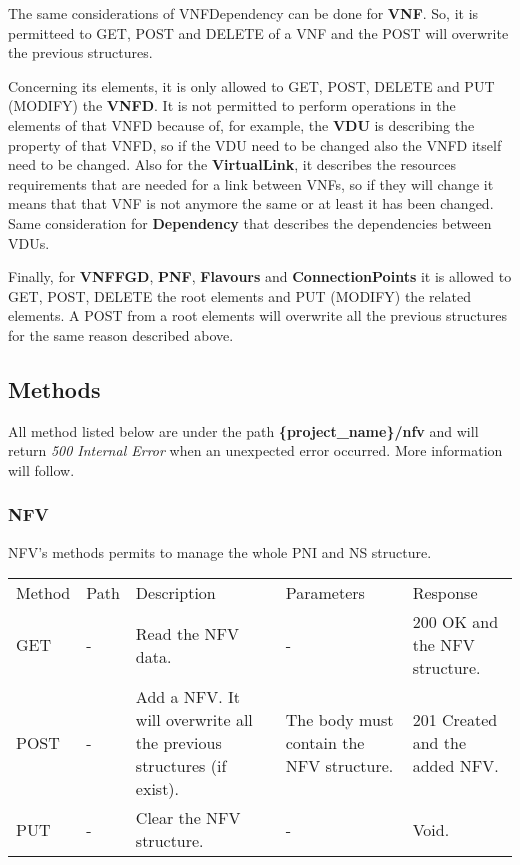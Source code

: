 \documentclass[11pt, english]{article}
\begin{document}
The same considerations of VNFDependency can be done for \textbf{VNF}. So, it is permitteed to GET, POST and DELETE of a VNF and the POST will overwrite the previous structures.

Concerning its elements, it is only allowed to GET, POST, DELETE and PUT (MODIFY) the \textbf{VNFD}. It is not permitted to perform operations in the elements of that VNFD because of, for example, the \textbf{VDU} is describing the property of that VNFD, so if the VDU need to be changed also the VNFD itself need to be changed. Also for the \textbf{VirtualLink}, it describes the resources requirements that are needed for a link between VNFs, so if they will change it means that that VNF is not anymore the same or at least it has been changed. Same consideration for \textbf{Dependency} that describes the dependencies between VDUs.

Finally, for \textbf{VNFFGD}, \textbf{PNF}, \textbf{Flavours} and \textbf{ConnectionPoints} it is allowed to GET, POST, DELETE the root elements and PUT (MODIFY) the related elements. A POST from a root elements will overwrite all the previous structures for the same reason described above.

\subsection{Methods}
All method listed below are under the path \textbf{\{project\_name\}/nfv} and will return \textit{500 Internal Error} when an unexpected error occurred. More information will follow.

\subsubsection{NFV}
NFV's methods permits to manage the whole PNI and NS structure. \\

\begin{tabular}{ |p{2cm}|m{3cm}|p{3cm}|p{3cm}|p{4cm}| }
    \hline
    \rowcolor{black} \multicolumn{5}{|c|}{\textcolor{white}{NFV}} \\
    \hline
    \rowcolor{Gray}
    Method & Path & Description & Parameters & Response \\
    \hline
    GET   & - & Read the NFV data. & - & 200 OK and the NFV structure. \\
    \hline
    POST & - & Add a NFV. It will overwrite all the previous structures (if exist). & The body must contain the NFV structure. & 201 Created and the added NFV. \\
    \hline
    PUT & - & Clear the NFV structure.  & - & Void. \\
    \hline
\end{tabular}
\end{document}

